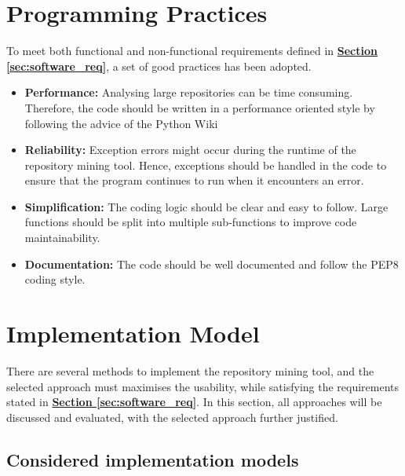\documentclass[12pt, a4paper]{report}
\begin{document}
\section{Programming Practices}
To meet both functional and non-functional requirements defined in
\hyperref[sec:software_req]{\textbf{Section \ref*{sec:software_req}}}, a set of good practices has
been adopted.
\begin{itemize}
  \item \textbf{Performance:} Analysing large repositories can be time consuming. Therefore, the
  code should be written in a performance oriented style by following the advice of the Python Wiki
  \cite{python_performance_tips}
  \item \textbf{Reliability:} Exception errors might occur during the runtime of the repository
  mining tool. Hence, exceptions should be handled in the code to ensure that the program continues
  to run when it encounters an error.
  \item \textbf{Simplification:} The coding logic should be clear and easy to follow. Large
  functions should be split into multiple sub-functions to improve code maintainability.
  \item \textbf{Documentation:} The code should be well documented and follow the PEP8 \cite{pep8}
  coding style.
\end{itemize}

\section{Implementation Model}
There are several methods to implement the repository mining tool, and the selected approach must
maximises the usability, while satisfying the requirements stated in
\hyperref[sec:software_req]{\textbf{Section \ref*{sec:software_req}}}. In this section, all
approaches will be discussed and evaluated, with the selected approach further justified.

\subsection{Considered implementation models}
\end{document}
